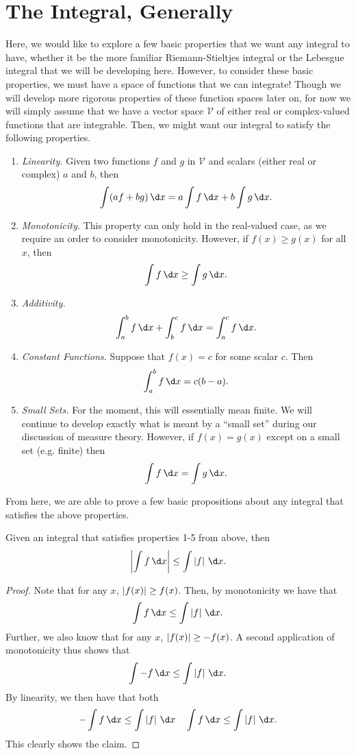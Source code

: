 \section{The Integral, Generally}

Here, we would like to explore a few basic properties that we want any integral to have, whether it be
the more familiar Riemann-Stieltjes integral or the Lebesgue integral that we will be developing here.
However, to consider these basic properties, we must have a space of functions that we can integrate!
Though we will develop more rigorous properties of these function spaces later on, for now we will
simply assume that we have a vector space $\mathcal{V}$ of either real or complex-valued functions that
are integrable. Then, we might want our integral to satisfy the following properties.
\begin{enumerate}
    \item   \emph{Linearity.} Given two functions $f$ and $g$ in $\mathcal{V}$ and scalars (either
        real or complex) $a$ and $b$, then
        \[
            \int (a f + b g)\,\d x = a \int f\,\d x + b \int g\,\d x.  
        \]
    \item   \emph{Monotonicity.} This property can only hold in the real-valued case, as we require an
        order to consider monotonicity. However, if $f(x) \geq g(x)$ for all $x$, then
        \[
            \int f \,\d x \geq \int g \,\d x.  
        \]
    \item   \emph{Additivity.}
        \[
            \int_a^b f\,\d x + \int_b^c f\,\d x = \int_a^c f\,\d x.  
        \]
    \item   \emph{Constant Functions.} Suppose that $f(x) = c$ for some scalar $c$. Then
        \[
            \int_a^b f\,\d x = c(b-a).  
        \]
    \item   \emph{Small Sets.} For the moment, this will essentially mean finite. We will continue to
        develop exactly what is meant by a ``small set'' during our discussion of measure theory.
        However, if $f(x) = g(x)$ except on a small set (e.g. finite) then
        \[
            \int f\,\d x = \int g\,\d x.  
        \]
\end{enumerate}

From here, we are able to prove a few basic propositions about any integral that satisfies the above
properties.
\begin{proposition}
    Given an integral that satisfies properties 1-5 from above, then
    \[
        \abs{\int f\,\d x} \leq \int \abs{f}\,\d x.
    \]
\end{proposition}
\begin{proof}
    Note that for any $x$, $\left\vert f(x) \right\vert \geq f(x)$. Then, by monotonicity we have that
    \[
        \int f \,\d x \leq \int \abs{f} \,\d x.
    \]
    Further, we also know that for any $x$, $\left\vert f(x) \right\vert \geq -f(x)$. A second application of
    monotonicity thus shows that
    \[
        \int -f \,\d x \leq \int \abs{f} \,\d x.  
    \]
    By linearity, we then have that both
    \[
        -\int f\,\d x \leq \int \abs{f} \,\d x \quad \int f\,\d x \leq \int \abs{f}\,\d x.
    \]
    This clearly shows the claim.
\end{proof}

